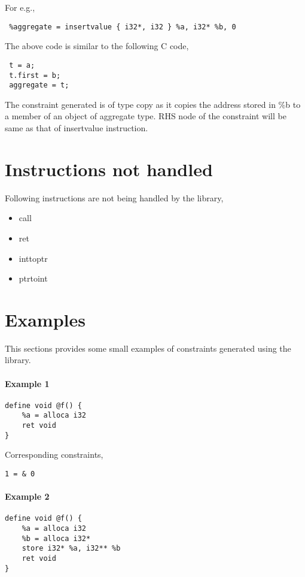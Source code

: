 \documentclass[a4paper,12pt]{report}
\begin{document}
For e.g.,

\begin{lstlisting}
 %aggregate = insertvalue { i32*, i32 } %a, i32* %b, 0
\end{lstlisting}

The above code is similar to the following C code,

\begin{lstlisting}
 t = a;
 t.first = b;
 aggregate = t;
\end{lstlisting}

The constraint generated is of type copy as it copies the address stored in \%b 
to a member of an object of aggregate type. RHS node of the constraint will be 
same as that of insertvalue instruction.

\section{Instructions not handled}
Following instructions are not being handled by the library,

\begin{itemize}
    \item call
    \item ret
    \item inttoptr
    \item ptrtoint
\end{itemize}

\section{Examples}
This sections provides some small examples of constraints generated using the
library.

\paragraph{Example 1}

\begin{verbatim}
define void @f() {
    %a = alloca i32
    ret void
}
\end{verbatim}

Corresponding constraints,
\begin{lstlisting}
1 = & 0
\end{lstlisting}

\paragraph{Example 2}
\begin{verbatim}
define void @f() {
    %a = alloca i32
    %b = alloca i32*
    store i32* %a, i32** %b
    ret void
}
\end{verbatim}
\end{document}
